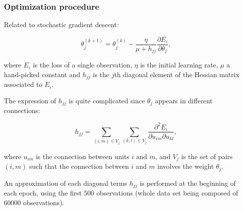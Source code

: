 \begin{frame}
	\frametitle{Optimization procedure}



Related to stochastic gradient descent:

	$$
	\theta^{(k+1)}_j = \theta^{(k)}_j - \frac{\eta}{\mu + h_{jj}} \frac{\partial E_i}{\partial \theta_j},
	$$

	\smallskip
	where $E_i$ is the loss of a single observation, $\eta$ is the initial learning rate, $\mu$ a hand-picked constant and $h_{jj}$ is the $j$th diagonal element of the Hessian matrix associated to $E_i$.

	\bigskip

	The expression of $h_{jj}$ is quite complicated since $\theta_j$ appears in different connections:

	$$
	h_{jj} = \sum_{(i,m) \in V_j} \sum_{(k,l) \in V_j} \frac{\partial^2 E_i}{\partial u_{im} \partial u_{k l}},
	$$

	\smallskip
	where $u_{im}$ is the connection between units $i$ and $m$, and $V_j$ is the set of pairs $(i,m)$ such that the connection between $i$ and $m$ involves the weight $\theta_j$.

	\bigskip

	An approximation of each diagonal terms $h_{jj}$ is performed at the beginning of each epoch, using the first $500$ observations (whole data set being composed of $60000$ observations).

	\end{frame}

